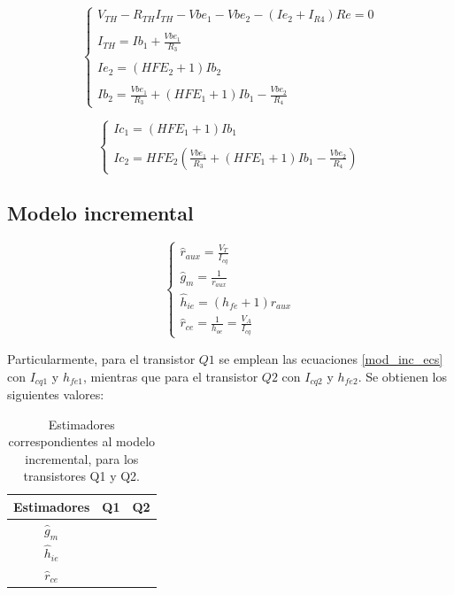 	\begin{equation}
	\begin{cases}
		V_{TH} -  R_{TH} I_{TH} - Vbe_1 - Vbe_2 -(Ie_2 + I_{R4})Re = 0\\ \\
		I_{TH} = Ib_1 + \frac{Vbe_1}{R_3}\\ \\
		Ie_2 = (HFE_2 + 1)Ib_2\\ \\
		Ib_2 = \frac{Vbe_1}{R_3} + (HFE_1+1)Ib_1 - \frac{Vbe_2}{R_4}
		\end{cases}
	\end{equation}
	
		\begin{equation}
	\begin{cases}
	Ic_1 = (HFE_1 + 1)Ib_1\\ \\
	Ic_2 = HFE_2 (\frac{Vbe_1}{R_3} + (HFE_1 + 1)Ib_1 - \frac{Vbe_2}{R_4})
	\end{cases}
	\end{equation}
	

	\subsection{Modelo incremental}
	
		\begin{equation}
			\begin{cases}
			\widehat{r}_{aux} = \frac{V_T}{I_{cq}}\\
			\widehat{g}_m = \frac{1}{r_{aux}}\\	
			\widehat{h}_{ie} = (h_{fe} + 1) r_{aux}\\
			\widehat{r}_{ce} = \frac{1}{h_{oe}} = \frac{V_A}{I_{cq}}
			\end{cases}
			\label{mod_inc_ecs}
		\end{equation}
	
	Particularmente, para el transistor $Q1$ se emplean las ecuaciones \ref{mod_inc_ecs} con $I_{cq1}$ y $h_{fe1}$, mientras que para el transistor $Q2$ con $I_{cq2}$ y $h_{fe2}$. Se obtienen los siguientes valores:
	
	\begin{table}[h!]
		\centering
		\begin{tabular}{c c c}%
			\bfseries Estimadores & Q1 & Q2 \\ \hline
			$\widehat{g}_m$ &  & \\
			$\widehat{h}_{ie}$ &  & \\
			$\widehat{r}_{ce}$&  & \\
			\hline
		\end{tabular}
		\caption{Estimadores correspondientes al modelo incremental, para los transistores Q1 y Q2.}
		\label{avolf}
	\end{table}
	
